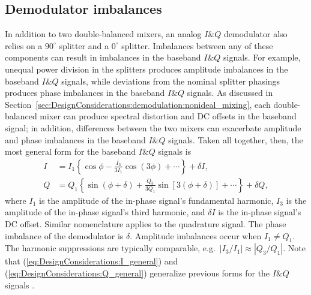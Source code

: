 \subsection{Demodulator imbalances}
In addition to two double-balanced mixers,
an analog $I\&Q$ demodulator also relies on
a $90^{\circ}$ splitter and a $0^{\circ}$ splitter.
Imbalances between any of these components
can result in imbalances in the baseband $I\&Q$ signals.
For example, unequal power division in the splitters
produces amplitude imbalances in the baseband $I\&Q$ signals, while
deviations from the nominal splitter phasings
produces phase imbalances in the baseband $I\&Q$ signals.
As discussed in
Section~\ref{sec:DesignConsiderations:demodulation:nonideal_mixing},
each double-balanced mixer can produce
spectral distortion and DC offsets in the baseband signal;
in addition, differences between the two mixers
can exacerbate amplitude and phase imbalances
in the baseband $I\&Q$ signals.
Taken all together, then,
the most general form for the baseband $I\&Q$ signals is
\begin{align}
  I
  &=
  I_1 \left\{%
    \cos\phi
    -
    \frac{I_3}{3 I_1}
    \cos \left( 3 \phi \right)
    +
    \cdots
  \right\}
  +
  \delta I,
  \label{eq:DesignConsiderations:I_general}
  \\
  Q
  &=
  Q_1 \left\{%
    \sin \left( \phi + \delta \right)
    +
    \frac{Q_3}{3 Q_1}
    \sin \left[ 3 \left( \phi + \delta \right) \right]
    +
    \cdots
  \right\}
  +
  \delta Q,
  \label{eq:DesignConsiderations:Q_general}
\end{align}
where
$I_1$ is the amplitude of the in-phase signal's fundamental harmonic,
$I_3$ is the amplitude of the in-phase signal's third harmonic, and
$\delta I$ is the in-phase signal's DC offset.
Similar nomenclature applies to the quadrature signal.
The phase imbalance of the demodulator is $\delta$.
Amplitude imbalances occur when $I_1 \neq Q_1$.
The harmonic suppressions are typically comparable,
e.g.\ $|I_3 / I_1| \approx |Q_3 / Q_1|$.
Note that (\ref{eq:DesignConsiderations:I_general}) and
(\ref{eq:DesignConsiderations:Q_general})
generalize previous forms for the $I\&Q$ signals
\cite{vanzeeland_rsi04}.


